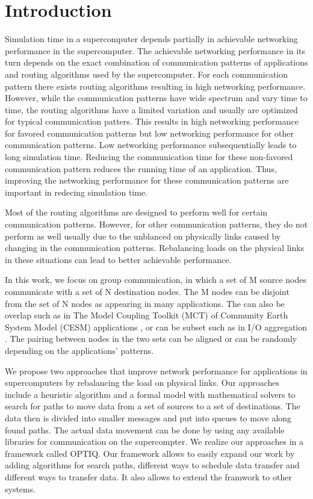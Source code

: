 \section{Introduction}
\label{sec:intro}
Simulation time in a supercomputer depends partially in achievable networking performance in the supercomputer. The achievable networking performance in its turn depends on the exact combination of communication patterns of applications and routing algorithms used by the supercomputer. For each communication pattern there exists routing algorithms resulting in high networking performance. However, while the communication patterns have wide spectrum and vary time to time, the routing algorithms have a limited variation and usually are optimized for typical communication patters. This results in high networking performance for favored communication patterns but low networking performance for other communication patterns. Low networking performance subsequentially leads to long simulation time. Reducing the communication time for these non-favored communication pattern reduces the running time of an application. Thus, improving the networking performance for these communication patterns are important in redecing simulation time. 

Most of the routing algorithms are designed to perform well for certain communication patterns. However, for other communication patterns, they do not perform as well usually due to the unblanced on physically links caused by changing in the communication patterns. Rebalancing loads on the physical links in these situations can lead to better achievable performance. 

In this work, we focus on group communication, in which a set of M source nodes communicate with a set of N destination nodes. The M nodes can be disjoint from the set of N nodes as appearing in many applications. The can also be overlap such as in The Model Coupling Toolkit (MCT) of Community Earth System Model (CESM) applications \cite{MCT:Jacob}, or can be subset such as in I/O aggregation \cite{Vishwanath:GLEAN}. The pairing between nodes in the two sets can be aligned or can be randomly depending on the applications' patterns.

We propose two approaches that improve network performance for applications in supercomputers by rebalancing the load on physical links. Our approaches include a heuristic algorithm and a formal model with mathematical solvers to search for paths to move data from a set of sources to a set of destinations. The data then is divided into smaller messages and put into queues to move along found paths. The actual data movement can be done by using any available libraries for communication on the supercompter. We realize our approaches in a framework called OPTIQ. Our framework allows to easily expand our work by adding algorithms for search paths, different ways to schedule data transfer and different ways to transfer data. It also allows to extend the framwork to other systems.

